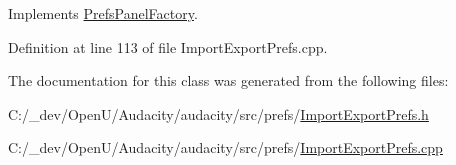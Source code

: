 Implements \hyperlink{class_prefs_panel_factory_a4814184d6050665a43f4929caa73aa0c}{Prefs\+Panel\+Factory}.



Definition at line 113 of file Import\+Export\+Prefs.\+cpp.



The documentation for this class was generated from the following files\+:\begin{DoxyCompactItemize}
\item 
C\+:/\+\_\+dev/\+Open\+U/\+Audacity/audacity/src/prefs/\hyperlink{_import_export_prefs_8h}{Import\+Export\+Prefs.\+h}\item 
C\+:/\+\_\+dev/\+Open\+U/\+Audacity/audacity/src/prefs/\hyperlink{_import_export_prefs_8cpp}{Import\+Export\+Prefs.\+cpp}\end{DoxyCompactItemize}

